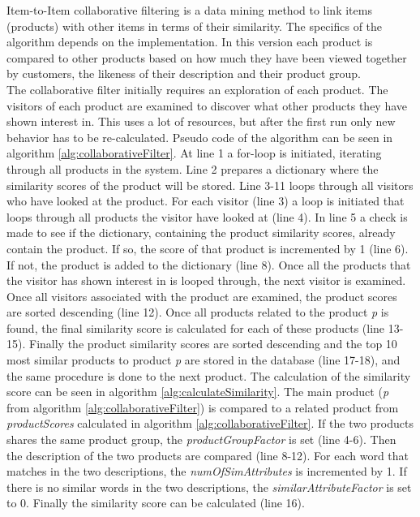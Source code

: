 Item-to-Item collaborative filtering is a data mining method to link items (products) with other items in terms of their similarity.
The specifics of the algorithm depends on the implementation. In this version each product is compared to other products based on how much they have been viewed together by customers, the likeness of their description and their product group. \\
The collaborative filter initially requires an exploration of each product. The visitors of each product are examined to discover what other products they have shown interest in. This uses a lot of resources, but after the first run only new behavior has to be re-calculated. Pseudo code of the algorithm can be seen in algorithm \ref{alg:collaborativeFilter}. At line 1 a for-loop is initiated, iterating through all products in the system. Line 2 prepares a dictionary where the similarity scores of the product will be stored. Line 3-11 loops through all visitors who have looked at the product. For each visitor (line 3) a loop is initiated that loops through all products the visitor have looked at (line 4). In line 5 a check is made to see if the dictionary, containing the product similarity scores, already contain the product. If so, the score of that product is incremented by 1 (line 6). If not, the product is added to the dictionary (line 8). Once all the products that the visitor has shown interest in is looped through, the next visitor is examined. Once all visitors associated with the product are examined, the product scores are sorted descending (line 12). Once all products related to the product \textit{p} is found, the final similarity score is calculated for each of these products (line 13-15). Finally the product similarity scores are sorted descending and the top 10 most similar products to product \textit{p} are stored in the database (line 17-18), and the same procedure is done to the next product. The calculation of the similarity score can be seen in algorithm \ref{alg:calculateSimilarity}. The main product (\textit{p} from algorithm \ref{alg:collaborativeFilter}) is compared to a related product from \textit{productScores} calculated in algorithm \ref{alg:collaborativeFilter}. If the two products shares the same product group, the \textit{productGroupFactor} is set (line 4-6). Then the description of the two products are compared (line 8-12). For each word that matches in the two descriptions, the \textit{numOfSimAttributes} is incremented by 1. If there is no similar words in the two descriptions, the \textit{similarAttributeFactor} is set to 0. Finally the similarity score can be calculated (line 16).\\\\

